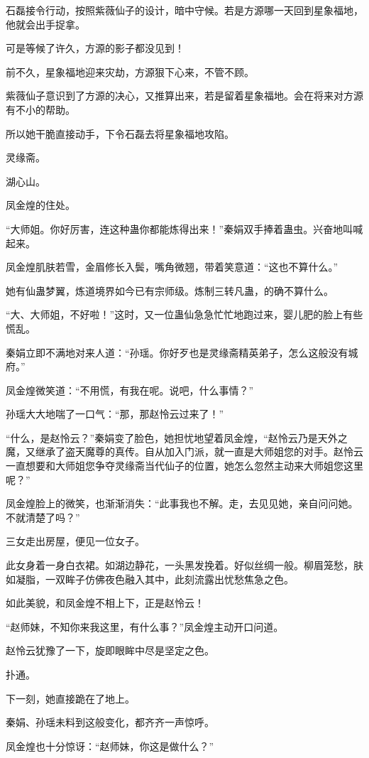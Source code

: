 \begin{this_body}
石磊接令行动，按照紫薇仙子的设计，暗中守候。若是方源哪一天回到星象福地，他就会出手捉拿。

可是等候了许久，方源的影子都没见到！

前不久，星象福地迎来灾劫，方源狠下心来，不管不顾。

紫薇仙子意识到了方源的决心，又推算出来，若是留着星象福地。会在将来对方源有不小的帮助。

所以她干脆直接动手，下令石磊去将星象福地攻陷。

灵缘斋。

湖心山。

凤金煌的住处。

“大师姐。你好厉害，连这种蛊你都能炼得出来！”秦娟双手捧着蛊虫。兴奋地叫喊起来。

凤金煌肌肤若雪，金眉修长入鬓，嘴角微翘，带着笑意道：“这也不算什么。”

她有仙蛊梦翼，炼道境界如今已有宗师级。炼制三转凡蛊，的确不算什么。

“大、大师姐，不好啦！”这时，又一位蛊仙急急忙忙地跑过来，婴儿肥的脸上有些慌乱。

秦娟立即不满地对来人道：“孙瑶。你好歹也是灵缘斋精英弟子，怎么这般没有城府。”

凤金煌微笑道：“不用慌，有我在呢。说吧，什么事情？”

孙瑶大大地喘了一口气：“那，那赵怜云过来了！”

“什么，是赵怜云？”秦娟变了脸色，她担忧地望着凤金煌，“赵怜云乃是天外之魔，又继承了盗天魔尊的真传。自从加入门派，就一直是大师姐您的对手。赵怜云一直想要和大师姐您争夺灵缘斋当代仙子的位置，她怎么忽然主动来大师姐您这里呢？”

凤金煌脸上的微笑，也渐渐消失：“此事我也不解。走，去见见她，亲自问问她。不就清楚了吗？”

三女走出房屋，便见一位女子。

此女身着一身白衣裙。如湖边静花，一头黑发挽着。好似丝绸一般。柳眉笼愁，肤如凝脂，一双眸子仿佛夜色融入其中，此刻流露出忧愁焦急之色。

如此美貌，和凤金煌不相上下，正是赵怜云！

“赵师妹，不知你来我这里，有什么事？”凤金煌主动开口问道。

赵怜云犹豫了一下，旋即眼眸中尽是坚定之色。

扑通。

下一刻，她直接跪在了地上。

秦娟、孙瑶未料到这般变化，都齐齐一声惊呼。

凤金煌也十分惊讶：“赵师妹，你这是做什么？”


\end{this_body}
